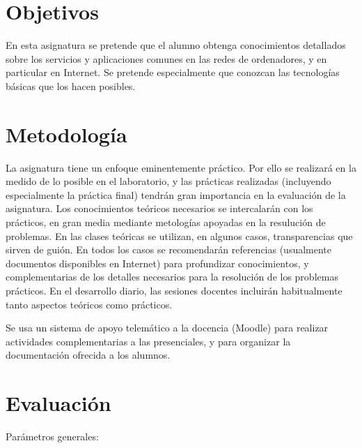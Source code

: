 \documentclass[a4paper,12pt]{report}
\begin{document}
\newpage

\section{Objetivos}

En esta asignatura se pretende que el alumno obtenga conocimientos detallados sobre los servicios y aplicaciones comunes en las redes de ordenadores, y en particular en Internet. Se pretende especialmente que conozcan las tecnologías básicas que los hacen posibles.

\section{Metodología}

La asignatura tiene un enfoque eminentemente práctico. Por ello se realizará en la medido de lo posible en el laboratorio, y las prácticas realizadas (incluyendo especialmente la práctica final) tendrán gran importancia en la evaluación de la asignatura. Los conocimientos teóricos necesarios se intercalarán con los prácticos, en gran media mediante metologías apoyadas en la resulución de problemas. En las clases teóricas se utilizan, en algunos casos, transparencias que sirven de guión. En todos los casos se recomendarán referencias (usualmente documentos disponibles en Internet) para profundizar conocimientos, y complementarias de los detalles necesarios para la resolución de los problemas prácticos. En el desarrollo diario, las sesiones docentes incluirán habitualmente tanto aspectos teóricos como prácticos.

Se usa un sistema de apoyo telemático a la docencia (Moodle) para realizar actividades complementarias a las presenciales, y para organizar la documentación ofrecida a los alumnos.

\section{Evaluación}

Parámetros generales:
\end{document}

